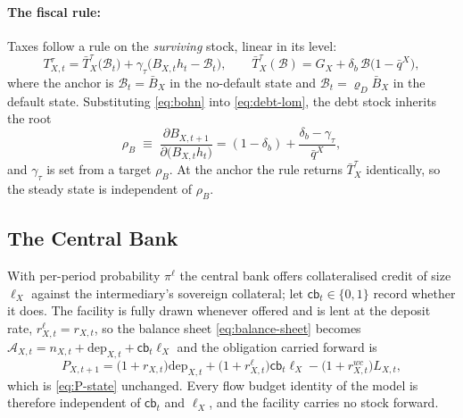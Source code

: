 \paragraph{The fiscal rule:} Taxes follow a \cite{bohn1998behavior} rule on the
\emph{surviving} stock, linear in its level:
\begin{equation}
T^{\tau}_{X,t}
=\bar T^{\tau}_X\bigl(\mathcal{B}_t\bigr)
 +\gamma_\tau\bigl(B_{X,t}h_t-\mathcal{B}_t\bigr),
\qquad
\bar T^{\tau}_X(\mathcal{B})=G_X+\delta_b\,\mathcal{B}\bigl(1-\bar q^{X}\bigr),
\label{eq:bohn}
\end{equation}
where the anchor is $\mathcal{B}_t=\bar B_X$ in the no-default state and
$\mathcal{B}_t=\varrho_D\bar B_X$ in the default state. Substituting
\eqref{eq:bohn} into \eqref{eq:debt-lom}, the debt stock inherits the root
\begin{equation}
\rho_B\;\equiv\;\frac{\partial B_{X,t+1}}{\partial\bigl(B_{X,t}h_t\bigr)}
=(1-\delta_b)+\frac{\delta_b-\gamma_\tau}{\bar q^{X}},
\label{eq:debt-root}
\end{equation}
and $\gamma_\tau$ is set from a target $\rho_B$. At the anchor the rule returns
$\bar T^{\tau}_X$ identically, so the steady state is independent of $\rho_B$.

\subsection{The Central Bank}
\label{sec:cb}

With per-period probability $\pi^{\ell}$ the central bank offers collateralised
credit of size $\ell_X$ against the intermediary's sovereign collateral; let
$\mathsf{cb}_t\in\{0,1\}$ record whether it does. The facility is fully drawn
whenever offered and is lent at the deposit rate, $r^{\ell}_{X,t}=r_{X,t}$, so the
balance sheet \eqref{eq:balance-sheet} becomes
$\mathcal{A}_{X,t}=n_{X,t}+\mathrm{dep}_{X,t}+\mathsf{cb}_t\ell_X$ and the
obligation carried forward is
\begin{equation}
P_{X,t+1}=\bigl(1+r_{X,t}\bigr)\mathrm{dep}_{X,t}
         +\bigl(1+r^{\ell}_{X,t}\bigr)\mathsf{cb}_t\ell_X
         -\bigl(1+r^{wc}_{X,t}\bigr)L_{X,t},
\label{eq:P-state-cb}
\end{equation}
which is \eqref{eq:P-state} unchanged. Every flow budget identity of the model is
therefore independent of $\mathsf{cb}_t$ and $\ell_X$, and the facility carries no
stock forward.

